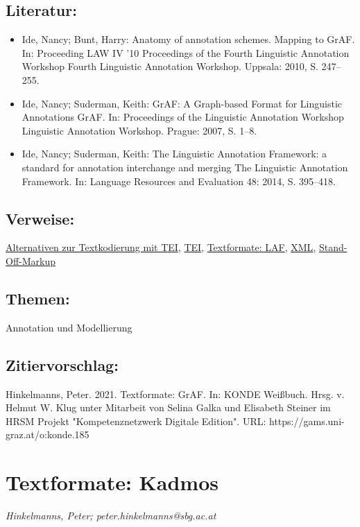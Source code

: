\documentclass{article}
\begin{document}
        \subsection*{Literatur:}\begin{itemize}\item Ide, Nancy; Bunt, Harry: Anatomy of annotation schemes. Mapping to GrAF. In: Proceeding LAW IV '10 Proceedings of the Fourth
                              Linguistic Annotation Workshop Fourth Linguistic Annotation
                              Workshop. Uppsala: 2010, S. 247–255.\item Ide, Nancy; Suderman, Keith: GrAF: A Graph-based Format for Linguistic
                              Annotations GrAF. In: Proceedings of the Linguistic Annotation
                              Workshop Linguistic Annotation Workshop. Prague: 2007, S. 1–8.\item Ide, Nancy; Suderman, Keith: The Linguistic Annotation Framework: a standard for
                              annotation interchange and merging The Linguistic Annotation Framework. In: Language Resources and Evaluation 48: 2014, S. 395–418.\end{itemize}\subsection*{Verweise:}\href{https://gams.uni-graz.at/o:konde.15}{Alternativen zur Textkodierung mit
                           TEI}, \href{https://gams.uni-graz.at/o:konde.178}{TEI}, \href{https://gams.uni-graz.at/o:konde.187}{Textformate: LAF}, \href{https://gams.uni-graz.at/o:konde.215}{XML}, \href{https://gams.uni-graz.at/o:konde.171}{Stand-Off-Markup}\subsection*{Themen:}Annotation und Modellierung\subsection*{Zitiervorschlag:}Hinkelmanns, Peter. 2021. Textformate: GrAF. In: KONDE Weißbuch. Hrsg. v. Helmut W. Klug unter Mitarbeit von Selina Galka und Elisabeth Steiner im HRSM Projekt "Kompetenznetzwerk Digitale Edition". URL: https://gams.uni-graz.at/o:konde.185\newpage\section*{Textformate: Kadmos} \emph{Hinkelmanns, Peter; peter.hinkelmanns@sbg.ac.at }\\
        
\end{document}
